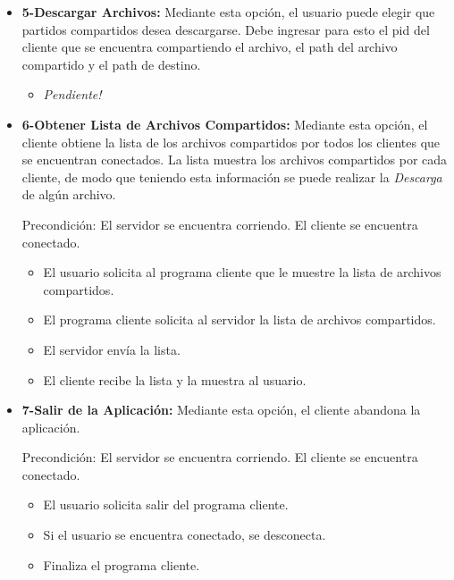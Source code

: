 \documentclass[a4paper,10pt]{article}
\begin{document}
\begin{itemize}
                \item \textbf{5-Descargar Archivos:} Mediante esta opci\'on, el usuario puede elegir que partidos compartidos desea descargarse. Debe ingresar
				para esto el pid del cliente que se encuentra compartiendo el archivo, el path del archivo compartido y el path de destino.
				
                \begin{itemize}
                    \item \textit{Pendiente!}
                \end{itemize}
                
                \item \textbf{6-Obtener Lista de Archivos Compartidos:} Mediante esta opci\'on, el cliente obtiene la lista de los archivos compartidos por 
				todos los clientes que se encuentran conectados. La lista muestra los archivos compartidos por cada cliente, de modo que teniendo esta 
				informaci\'on se puede realizar la \emph{Descarga} de alg\'un archivo.
                   
                Precondici\'on: El servidor se encuentra corriendo. El cliente se encuentra conectado.
				
                \begin{itemize}
                   \item El usuario solicita al programa cliente que le muestre la lista de archivos compartidos.
                   \item El programa cliente solicita al servidor la lista de archivos compartidos.
                   \item El servidor env\'ia la lista.
                   \item El cliente recibe la lista y la muestra al usuario.
                \end{itemize}
                
                \item \textbf{7-Salir de la Aplicaci\'on:} Mediante esta opci\'on, el cliente abandona la aplicaci\'on.

                Precondici\'on: El servidor se encuentra corriendo. El cliente se encuentra conectado.
                
                \begin{itemize}
                    \item El usuario solicita salir del programa cliente.
                    \item Si el usuario se encuentra conectado, se desconecta.
                    \item Finaliza el programa cliente.
                \end{itemize}
			\end{itemize}
\end{document}
